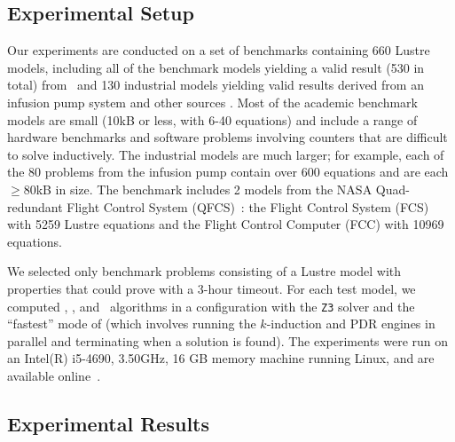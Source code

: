 \subsection{Experimental Setup}

Our experiments are conducted on a set of benchmarks containing 660 Lustre models, including all of the benchmark models yielding a valid result (530 in total) from~\cite{Hagen08:FMCAD, piskac2016} and 130 industrial models yielding valid results derived from an infusion pump system \cite{hilt2013} and other sources \cite{piskac2016, NFM2015:backes}.
Most of the academic benchmark models are small (10kB or less, with 6-40 equations) and include a range of hardware benchmarks and software problems involving counters that are difficult to solve inductively.
The industrial models are much larger; for example, each of the 80 problems from the infusion pump \cite{hilt2013} contain over 600 equations and are each $\geq$80kB in size. The benchmark includes 2 models from the NASA Quad-redundant Flight Control System (QFCS)~\cite{NFM2015:backes}: the Flight Control System (FCS) with 5259 Lustre equations and the Flight Control Computer (FCC) with 10969 equations.

We selected only benchmark problems consisting of a Lustre model with
properties that \jkind could prove with a 3-hour timeout.
For each test model, we computed \aivcalg, \ucalg, and \ucbfalg ~algorithms in a configuration with the \texttt{Z3} solver and the ``fastest'' mode of \jkind (which involves running the $k$-induction and PDR engines in parallel and terminating when a solution is found). The experiments were run on an  Intel(R) i5-4690, 3.50GHz, 16 GB memory machine running Linux, and are available online~\cite{expr}.%



\subsection{Experimental Results}

 